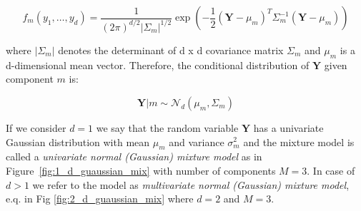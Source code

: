 \begin{equation}
    f_m(y_1,\ldots,y_d) = \frac{1}{{(2\pi)}^{d/2}|\Sigma_m|^{1/2}} \exp\left(-\frac{1}{2}{(\textbf{Y}-\mu_m)}^T\Sigma_m^{-1}(\textbf{Y}-\mu_m)\right)
\end{equation}

where $|\Sigma_m|$ denotes the determinant of d x d covariance matrix $\Sigma_m$ and $\mu_m$ is a d-dimensional mean vector. Therefore, the conditional distribution of $\textbf{Y}$ given component $m$ is:

\begin{equation}
    \textbf{Y}|m \sim \mathcal{N}_d(\mu_m,\Sigma_m)
\end{equation}

If we consider $d=1$ we say that the random variable $\textbf{Y}$ has a univariate Gaussian distribution with mean $\mu_m$ and variance $\sigma_m^2$ and the 
mixture model is called a \textit{univariate normal (Gaussian) mixture model} as in Figure~\ref{fig:1_d_guaussian_mix} with number of components $M=3$. In case of $d>1$ we refer to the model as \textit{multivariate normal (Gaussian) mixture model}, e.q. in Fig \ref{fig:2_d_guaussian_mix} 
where $d=2$ and $M=3$.

